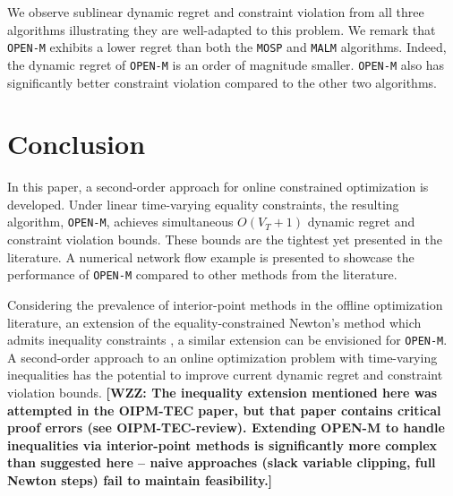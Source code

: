 \documentclass[journal,twoside,web]{ieeecolor}
\newcommand{\WZZ}[1]{{\color{red}\bf{[WZZ: #1]}}}
\begin{document}
We observe sublinear dynamic regret and constraint violation from all three algorithms illustrating they are well-adapted to this problem. We remark that \texttt{OPEN-M} exhibits a lower regret than both the \texttt{MOSP} and \texttt{MALM} algorithms. Indeed, the dynamic regret of \texttt{OPEN-M} is an order of magnitude smaller. \texttt{OPEN-M} also has significantly better constraint violation compared to the other two algorithms.




\section{Conclusion}

In this paper, a second-order approach for online constrained optimization is developed. Under linear time-varying equality constraints, the resulting algorithm, \texttt{OPEN-M}, achieves simultaneous $O(V_T+1)$ dynamic regret and constraint violation bounds. These bounds are the tightest yet presented in the literature. A numerical network flow example is presented to showcase the performance of \texttt{OPEN-M} compared to other methods from the literature.

Considering the prevalence of interior-point methods in the offline optimization literature, an extension of the equality-constrained Newton's method which admits inequality constraints \cite{renegar}, a similar extension can be envisioned for \texttt{OPEN-M}. A second-order approach to an online optimization problem with time-varying inequalities has the potential to improve current dynamic regret and constraint violation bounds.
\WZZ{The inequality extension mentioned here was attempted in the OIPM-TEC paper,
but that paper contains critical proof errors (see OIPM-TEC-review).
Extending OPEN-M to handle inequalities via interior-point methods is significantly
more complex than suggested here -- naive approaches (slack variable clipping,
full Newton steps) fail to maintain feasibility.} 






 


\end{document}
